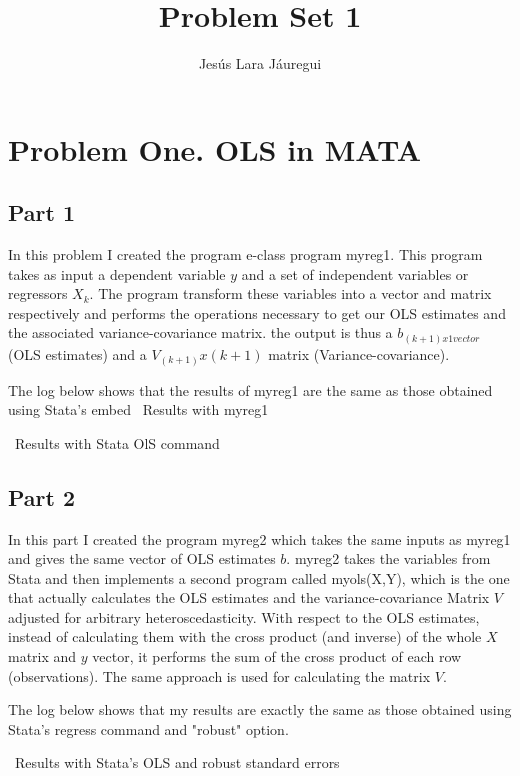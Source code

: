 \documentclass[12pt]{article}
\begin{document}
\author{Jesús Lara Jáuregui}
\title{Problem Set 1}
\maketitle
\section{Problem One. OLS in MATA}
\subsection{Part 1}
In this problem I created the program e-class program myreg1. This program takes as input a dependent variable $y$ and a set of independent variables or regressors $X_k$. The program transform these variables into a vector and matrix respectively and performs the operations necessary to get our OLS estimates and the associated variance-covariance matrix. the output is thus a $b_{(k+1)x1 vector}$ (OLS estimates)  and a $V_(k+1)x(k+1)$ matrix (Variance-covariance).

The log below shows that the results of myreg1 are the same as those obtained using Stata's embed
\ Results with myreg1
\begin{stlog}\end{stlog}
\ Results with Stata OlS command
\begin{stlog}\end{stlog}

\subsection{Part 2}
\pagebreak
In this part I created the program myreg2 which takes the same inputs as myreg1 and gives the same vector of OLS estimates $b$. myreg2 takes the variables from Stata and then implements a second program called myols(X,Y), which is the one that actually calculates the OLS estimates and the variance-covariance Matrix $V$ adjusted for arbitrary heteroscedasticity. With respect to the OLS estimates, instead of calculating them with the cross product (and inverse) of the whole $X$ matrix and $y$ vector, it performs the sum of the cross product of each row (observations). The same approach is used for calculating the matrix $V$.

The log below shows that my results are exactly the same as those obtained using Stata's regress command and "robust" option. 

\begin{stlog}\end{stlog}
\ Results with Stata's OLS and robust standard errors
\begin{stlog}\end{stlog}
\pagebreak
\end{document}

